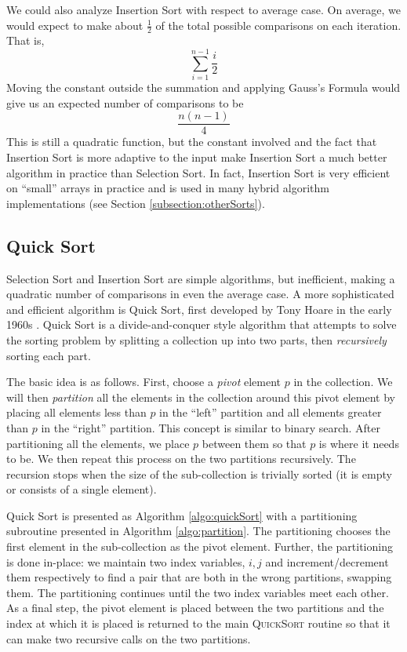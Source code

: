 We could also analyze Insertion Sort with respect to average case.  On 
average, we would expect to make about $\frac{1}{2}$ of the total 
possible comparisons on each iteration.  That is, 
$$\sum_{i=1}^{n-1} \frac{i}{2}$$
Moving the constant outside the summation and applying Gauss's Formula
would give us an expected number of comparisons to be
$$\frac{n(n-1)}{4}$$
This is still a quadratic function, but the constant involved and the
fact that Insertion Sort is more adaptive to the input make Insertion
Sort a much better algorithm in practice than Selection Sort.  In
fact, Insertion Sort is very efficient on ``small'' arrays in practice
and is used in many hybrid algorithm implementations (see Section
\ref{subsection:otherSorts}).


\subsection{Quick Sort}

Selection Sort and Insertion Sort are simple algorithms, but inefficient, 
making a quadratic number of comparisons in even the average case.  A
more sophisticated and efficient algorithm is Quick Sort, first developed
by Tony Hoare in the early 1960s \cite{Hoare:1961:AQ:366622.366644,Quicksort}.
Quick Sort is a divide-and-conquer style algorithm that attempts to solve
the sorting problem by splitting a collection up into two parts, then
\emph{recursively} sorting each part.  

The basic idea is as follows.  First, choose a \emph{pivot} element $p$
in the collection.  We will then \emph{partition} all the elements in the
collection around this pivot element by placing all elements less than
$p$ in the ``left'' partition and all elements greater than $p$ in the
``right'' partition.  This concept is similar to binary search.  After
partitioning all the elements, we place $p$ between them so that $p$ is
where it needs to be.  We then repeat this process on the two partitions
recursively.  The recursion stops when the size of the sub-collection is
trivially sorted (it is empty or consists of a single element).

Quick Sort is presented as Algorithm \ref{algo:quickSort} with a 
partitioning subroutine presented in Algorithm \ref{algo:partition}.  
The partitioning chooses the first element in the sub-collection as
the pivot element.  Further, the partitioning is done in-place: we
maintain two index variables, $i, j$ and increment/decrement them 
respectively to find a pair that are both in the wrong partitions, 
swapping them.  The partitioning continues until the two index 
variables meet each other.  As a final step, the pivot element
is placed between the two partitions and the index at which it is
placed is returned to the main \textsc{QuickSort} routine so that
it can make two recursive calls on the two partitions.

